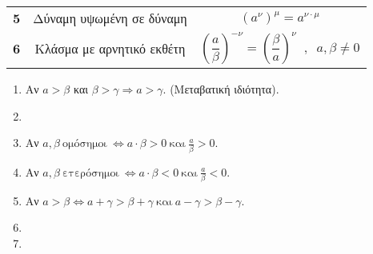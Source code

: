 \documentclass[twoside,nofonts,internet,shmeiwseis]{thewria}
\begin{document}
\begin{enumerate}
\begin{center}
\begin{longtable}{ccc}
\rule[-2ex]{0pt}{5.5ex} \textbf{5} & Δύναμη υψωμένη σε δύναμη & $ \left( a^\nu\right)^\mu=a^{\nu\cdot\mu} $ \\
\rule[-2ex]{0pt}{5.5ex} \textbf{6} & Κλάσμα με αρνητικό εκθέτη & $ \left( \dfrac{a}{\beta}\right)^{-\nu}=\left(\dfrac{\beta}{a}\right)^\nu\;\;,\;\;a,\beta\neq0 $ \vspace{2mm}\\
\hline
\end{longtable}
\end{center}
\vspace{-10mm}
\begin{enumerate}
\item Αν $ a>\beta $ και $ \beta>\gamma \Rightarrow a>\gamma $. (Μεταβατική ιδιότητα).
\item 
{}
\item Αν $ a,\beta\ \textrm{ομόσημοι}\ \Leftrightarrow a\cdot\beta>0\ \textrm{και}\ \frac{a}{\beta}>0 $.
\item Αν $ a,\beta\ \textrm{ετερόσημοι}\ \Leftrightarrow a\cdot\beta<0\ \textrm{και}\ \frac{a}{\beta}<0 $.
\item Αν $ a>\beta\Leftrightarrow a+\gamma>\beta+\gamma\ \textrm{και}\ a-\gamma>\beta-\gamma $.
\item 
{}
\item {}
\end{enumerate}

\end{enumerate}
\end{document}

